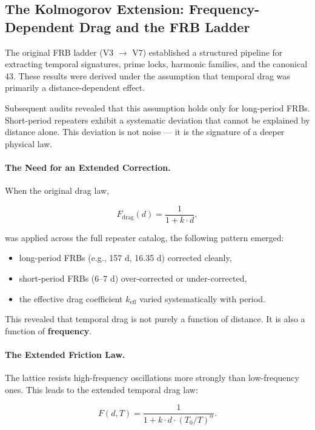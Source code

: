 \documentclass[11pt, letterpaper, openany]{book}
\begin{document}
\subsection{The Kolmogorov Extension: Frequency-Dependent Drag and the FRB Ladder}

The original FRB ladder (V3 $\rightarrow$ V7) established a structured pipeline for extracting 
temporal signatures, prime locks, harmonic families, and the canonical 43. These results were 
derived under the assumption that temporal drag was primarily a distance-dependent effect.

Subsequent audits revealed that this assumption holds only for long-period FRBs.  
Short-period repeaters exhibit a systematic deviation that cannot be explained by distance alone.  
This deviation is not noise --- it is the signature of a deeper physical law.

\paragraph{The Need for an Extended Correction.}

When the original drag law,


\[
F_{\text{drag}}(d) = \frac{1}{1 + k \cdot d},
\]


was applied across the full repeater catalog, the following pattern emerged:

\begin{itemize}
    \item long-period FRBs (e.g., 157 d, 16.35 d) corrected cleanly,
    \item short-period FRBs (6--7 d) over-corrected or under-corrected,
    \item the effective drag coefficient $k_{\text{eff}}$ varied systematically with period.
\end{itemize}

This revealed that temporal drag is not purely a function of distance.  
It is also a function of \textbf{frequency}.

\paragraph{The Extended Friction Law.}

The lattice resists high-frequency oscillations more strongly than low-frequency ones.  
This leads to the extended temporal drag law:

\begin{equation}
F(d,T) = \frac{1}{1 + k \cdot d \cdot (T_0/T)^\alpha}.
\end{equation}
\end{document}
